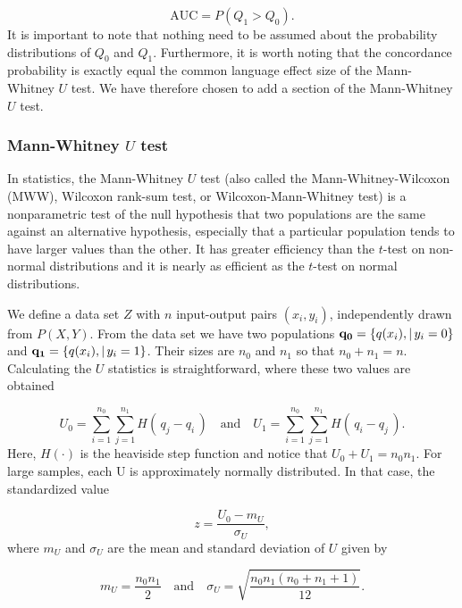 \begin{equation}
\label{eq:concurrent}
\mbox{AUC} = P(Q_1 > Q_0).
\end{equation}
It is important to note that nothing need to be assumed about the probability distributions of $Q_0$ and $Q_1$.  Furthermore, it is worth noting that the concordance probability is exactly equal the common language effect size of the Mann-Whitney $U$ test.  We have therefore chosen to add a section of the Mann-Whitney $U$ test.

\subsubsection{Mann-Whitney $U$ test}
\label{sec:U}

In statistics, the Mann-Whitney $U$ test (also called the Mann-Whitney-Wilcoxon (MWW), Wilcoxon rank-sum test, or Wilcoxon-Mann-Whitney test) is a nonparametric test of the null hypothesis that two populations are the same against an alternative hypothesis, especially that a particular population tends to have larger values than the other.  It has greater efficiency than the $t$-test on non-normal distributions and it is nearly as efficient as the $t$-test on normal distributions.

We define a data set $Z$ with $n$ input-output pairs $(x_i, y_i)$, independently drawn from $P(X,Y)$.  From the data set we have two populations $\mathbf{q_0} = \{q(x_i) , | \, y_i = 0 \}$ and $\mathbf{q_1} = \{q(x_i) , | \, y_i = 1 \}$.  Their sizes are $n_0$ and $n_1$ so that $n_0 + n_1 = n$.  Calculating the $U$ statistics is straightforward, where these two values are obtained 

\begin{equation}
\label{eq:U}
U_0 = \sum_{i=1}^{n_0}\sum_{j=1}^{n_1} H(\,q_j - q_i    \,) \quad \mbox{and} \quad 
U_1 = \sum_{i=1}^{n_0}\sum_{j=1}^{n_1} H( \,q_i - q_j    \,).
\end{equation}
Here, $H(\cdot)$ is the heaviside step function and notice that $U_0 + U_1 = n_0n_1$.  For large samples, each U is approximately normally distributed. In that case, the standardized value

\begin{equation}
\label{eq:z}
z = \frac{U_0 - m_{U}}{\sigma_{U}},
\end{equation}
where $m_U$ and $\sigma_U$ are the mean and standard deviation of $U$ given by

\begin{equation}
\label{eq:z}
m_U = \frac{n_0n_1}{2} \quad \mbox{and} \quad 
\sigma_U = \sqrt{\frac{n_0n_1(n_0 + n_1 + 1)}{12} }.
\end{equation}

